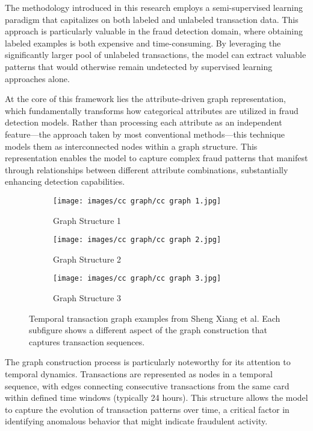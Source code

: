 \documentclass[a4paper, 11pt, twoside, openright]{report}
\begin{document}
The methodology introduced in this research employs a semi-supervised learning paradigm that capitalizes on both labeled and unlabeled transaction data. This approach is particularly valuable in the fraud detection domain, where obtaining labeled examples is both expensive and time-consuming. By leveraging the significantly larger pool of unlabeled transactions, the model can extract valuable patterns that would otherwise remain undetected by supervised learning approaches alone.

At the core of this framework lies the attribute-driven graph representation, which fundamentally transforms how categorical attributes are utilized in fraud detection models. Rather than processing each attribute as an independent feature—the approach taken by most conventional methods—this technique models them as interconnected nodes within a graph structure. This representation enables the model to capture complex fraud patterns that manifest through relationships between different attribute combinations, substantially enhancing detection capabilities.

\begin{figure}[h!]
    \centering
    \begin{subfigure}[b]{0.32\textwidth}
        \texttt{[image: images/cc graph/cc graph 1.jpg]} %
        \caption{Graph Structure 1}
        \label{fig:graph1}
    \end{subfigure}
    \hfill
    \begin{subfigure}[b]{0.32\textwidth}
        \texttt{[image: images/cc graph/cc graph 2.jpg]} %
        \caption{Graph Structure 2}
        \label{fig:graph2}
    \end{subfigure}
    \hfill
    \begin{subfigure}[b]{0.32\textwidth}
        \texttt{[image: images/cc graph/cc graph 3.jpg]} %
        \caption{Graph Structure 3}
        \label{fig:graph3}
    \end{subfigure}
    \caption{Temporal transaction graph examples from Sheng Xiang et al. Each subfigure shows a different aspect of the graph construction that captures transaction sequences.}
    \label{fig:graph_group}
\end{figure}


The graph construction process is particularly noteworthy for its attention to temporal dynamics. Transactions are represented as nodes in a temporal sequence, with edges connecting consecutive transactions from the same card within defined time windows (typically 24 hours). This structure allows the model to capture the evolution of transaction patterns over time, a critical factor in identifying anomalous behavior that might indicate fraudulent activity.
\end{document}
